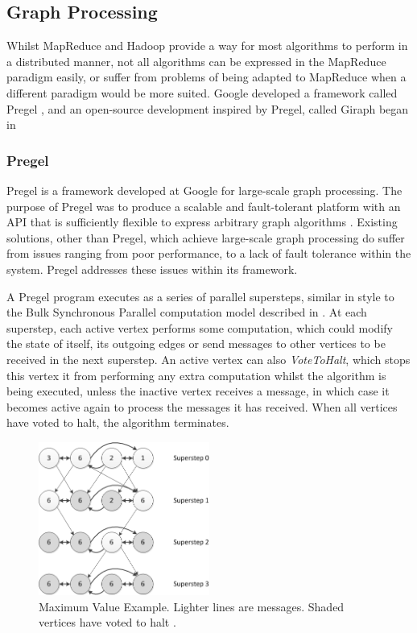 \subsection{Graph Processing}
Whilst MapReduce and Hadoop provide a way for most algorithms to perform in a distributed manner, not all algorithms can be expressed in the MapReduce paradigm easily, or suffer from problems of being adapted to MapReduce when a different paradigm would be more suited. Google developed a framework called Pregel \cite{pregel}, and an open-source development inspired by Pregel, called Giraph \citep{giraphtalk} began in \citeyear{giraphtalk}

\subsubsection{Pregel}
Pregel is a framework developed at Google for large-scale graph processing. The purpose of Pregel was to produce a scalable and fault-tolerant platform with an API that is sufficiently flexible to express arbitrary graph algorithms \cite{pregel}. Existing solutions, other than Pregel, which achieve large-scale graph processing do suffer from issues ranging from poor performance, to a lack of fault tolerance within the system. Pregel addresses these issues within its framework.

A Pregel program executes as a series of parallel supersteps, similar in style to the Bulk Synchronous Parallel computation model described in \cite{bsp}. At each superstep, each active vertex performs some computation, which could modify the state of itself, its outgoing edges or send messages to other vertices to be received in the next superstep. An active vertex can also \emph{VoteToHalt}, which stops this vertex it from performing any extra computation whilst the algorithm is being executed, unless the inactive vertex receives a message, in which case it becomes active again to process the messages it has received. When all vertices have voted to halt, the algorithm terminates.

\begin{figure}[htbp]
  \centering
    \includegraphics[width=0.5\textwidth]{./img/superstep}
  \caption{Maximum Value Example. Lighter lines are messages. Shaded vertices have voted to halt \cite{pregel}.}
  \label{fig:superstep}
\end{figure}

